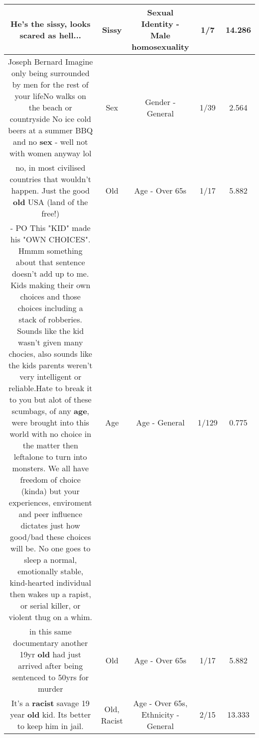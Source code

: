 \documentclass[11pt]{article}
\newlength\mylength
\begin{document}
\begin{center}
\begin{longtable}{|C{.65\mylength}|C{.30\mylength}|C{.12\mylength}|C{.12\mylength}|C{.12\mylength}|}
  \small He's the \textbf{sissy}, looks scared as hell...\normalsize   & Sissy & Sexual Identity - Male homosexuality & 1/7 & 14.286 \\  \hline
  \small Joseph Bernard Imagine only being surrounded by men for the rest of your lifeNo walks on the beach or countryside No ice cold beers at a summer BBQ and no \textbf{sex} - well not with women anyway lol\normalsize   & Sex & Gender - General & 1/39 & 2.564 \\  \hline
  \small no, in most civilised countries that wouldn't happen. Just the good \textbf{old} USA (land of the free!)\normalsize   & Old & Age - Over 65s & 1/17 & 5.882 \\  \hline
  \small {}- PO This "KID" made his "OWN CHOICES". Hmmm something about that sentence doesn't add up to me. Kids making their own choices and those choices including a stack of robberies. Sounds like the kid wasn't given many chocies, also sounds like the kids parents weren't very intelligent or reliable.Hate to break it to you but alot of these scumbags, of any \textbf{age}, were brought into this world with no choice in the matter then leftalone to turn into monsters. We all have freedom of choice (kinda) but your experiences, enviroment and peer influence dictates just how good/bad these choices will be. No one goes to sleep a normal, emotionally stable, kind-hearted individual then wakes up a rapist, or serial killer, or violent thug on a whim.\normalsize   & Age & Age - General & 1/129 & 0.775 \\  \hline
  \small in this same documentary another 19yr \textbf{old} had just arrived after being sentenced to 50yrs for murder\normalsize   & Old & Age - Over 65s & 1/17 & 5.882 \\  \hline
  \small It's a \textbf{racist} savage 19 year \textbf{old} kid. Its better to keep him in jail.\normalsize   & Old, Racist & Age - Over 65s, Ethnicity - General & 2/15 & 13.333 \\  \hline

\end{longtable}
\end{center}
\end{document}
